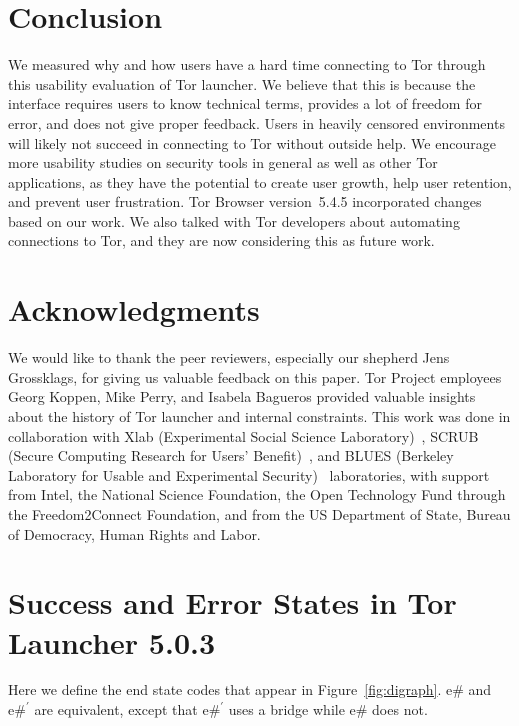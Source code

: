 \documentclass[USenglish,oneside,twocolumn]{article}
\begin{document}
\section{Conclusion} 
\label{sec:conclusion}
We measured why and how users have a hard time connecting to Tor through this usability evaluation of Tor launcher. We believe that this is because the interface requires users to know technical terms, provides a lot of freedom for error, and does not give proper feedback. Users in heavily censored environments will likely not succeed in connecting to Tor without outside help. We encourage more usability studies on security tools in general as well as other Tor applications, as they have the potential to create user growth, help user retention, and prevent user frustration. Tor Browser version~5.4.5 incorporated  changes based on our work. We also talked with Tor developers about automating connections to Tor, and they are now considering this as future work. 

\section {Acknowledgments}
We would like to thank the peer reviewers, especially our shepherd Jens Grossklags, for giving us valuable feedback on this paper. Tor Project employees Georg Koppen, Mike Perry, and Isabela Bagueros provided valuable insights about the history of Tor launcher and internal constraints. This work was done in collaboration with Xlab (Experimental Social Science Laboratory)~\cite{xlab}, SCRUB (Secure Computing Research for Users' Benefit)~\cite{scrub}, and BLUES (Berkeley Laboratory for Usable and Experimental Security)~\cite{blues} laboratories, with support from
Intel, the National Science Foundation,
the Open Technology Fund through the Freedom2Connect Foundation, and from
the US Department of State, Bureau of Democracy, Human Rights and Labor.




\appendix

\section{Success and Error States in Tor Launcher 5.0.3} 
\label{states} 
Here we define the end state codes that appear in Figure~\ref{fig:digraph}.
e\# and $\mbox{e\#}^\prime$ are equivalent, except that $\mbox{e\#}^\prime$ uses a bridge while e\# does not. \\
\end{document}
